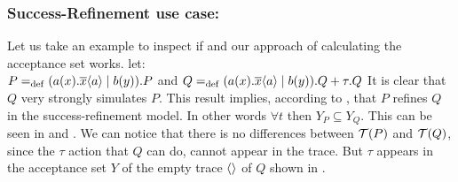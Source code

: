 \subsubsection{Success-Refinement use case:}
Let us take an example to inspect if  and our approach of calculating the acceptance set works. let:\\
$P=_{\mathrm{def}}(a(x).\overline{x}\langle a\rangle \mid b(y)).P$ and 
$Q=_{\mathrm{def}}(a(x).\overline{x}\langle a\rangle \mid b(y)).Q + \tau.Q$
It is clear that $Q$ very strongly simulates $P$. This result implies, according to , that $P$ refines $Q$ in the success-refinement model. In other words $\forall t$ then $Y_P \subseteq Y_Q$.
This can be seen in  and . We can notice that there is no differences between $\Traces[P]$ and $\Traces[Q]$, since the $\tau$ action that $Q$ can do, cannot appear in the trace. But $\tau$ appears in the acceptance set $Y$ of the empty trace $\overline{}\langle\rangle$ of $Q$ shown in .

